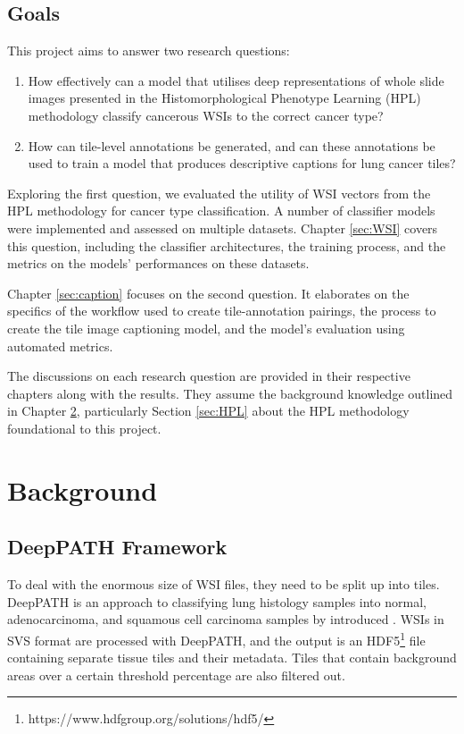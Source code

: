 \documentclass{l4proj}
\begin{document}
\section{Goals}
This project aims to answer two research questions:
\begin{enumerate}
    \item How effectively can a model that utilises deep representations of whole slide images presented in the Histomorphological Phenotype Learning (HPL) methodology classify cancerous WSIs to the correct cancer type?

    \item How can tile-level annotations be generated, and can these annotations be used to train a model that produces descriptive captions for lung cancer tiles?

\end{enumerate}

Exploring the first question, we evaluated the utility of WSI vectors from the HPL methodology for cancer type classification. A number of classifier models were implemented and assessed on multiple datasets. Chapter \ref{sec:WSI} covers this question, including the classifier architectures, the training process, and the metrics on the models' performances on these datasets.

Chapter \ref{sec:caption} focuses on the second question. It elaborates on the specifics of the workflow used to create tile-annotation pairings, the process to create the tile image captioning model, and the model's evaluation using automated metrics.

The discussions on each research question are provided in their respective chapters along with the results. They assume the background knowledge outlined in Chapter \ref{sec:background}, particularly Section \ref{sec:HPL} about the HPL methodology foundational to this project.

\chapter{Background} \label{sec:background}

\section{DeepPATH Framework} \label{sec:deeppath}
To deal with the enormous size of WSI files, they need to be split up into tiles. DeepPATH is an approach to classifying lung histology samples into normal, adenocarcinoma, and squamous cell carcinoma samples by introduced \cite{Coudray2018}. WSIs in SVS format are processed with DeepPATH, and the output is an HDF5\footnote{https://www.hdfgroup.org/solutions/hdf5/} file containing separate tissue tiles and their metadata. Tiles that contain background areas over a certain threshold percentage are also filtered out.
\end{document}
